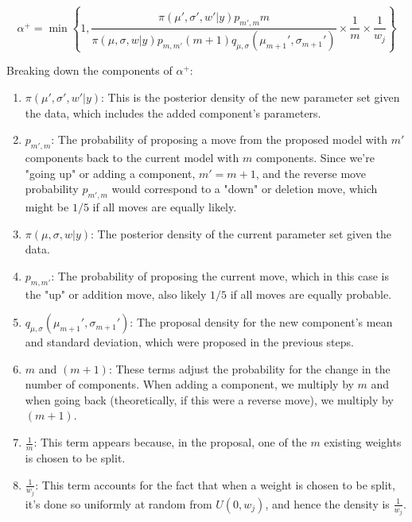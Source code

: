 \documentclass[10pt]{article}
\begin{document}
\[ \alpha^+ = \min \left\{ 1, \frac{\pi(\mu', \sigma', w'|y)p_{m',m}m}{\pi(\mu, \sigma, w|y)p_{m,m'}(m+1)q_{\mu,\sigma}(\mu_{m+1}', \sigma_{m+1}')}\times \frac{1}{m} \times \frac{1}{w_j} \right\} \]

Breaking down the components of \( \alpha^+ \):

\begin{enumerate}
  \item \( \pi(\mu', \sigma', w'|y) \): This is the posterior density of the new parameter set given the data, which includes the added component's parameters.

  \item \( p_{m',m} \): The probability of proposing a move from the proposed model with \( m' \) components back to the current model with \( m \) components. Since we're "going up" or adding a component, \( m' = m + 1 \), and the reverse move probability \( p_{m',m} \) would correspond to a "down" or deletion move, which might be \( 1/5 \) if all moves are equally likely.

  \item \( \pi(\mu, \sigma, w|y) \): The posterior density of the current parameter set given the data.

  \item \( p_{m,m'} \): The probability of proposing the current move, which in this case is the "up" or addition move, also likely \( 1/5 \) if all moves are equally probable.

  \item \( q_{\mu,\sigma}(\mu_{m+1}', \sigma_{m+1}') \): The proposal density for the new component's mean and standard deviation, which were proposed in the previous steps.

  \item \( m \) and \( (m+1) \): These terms adjust the probability for the change in the number of components. When adding a component, we multiply by \( m \) and when going back (theoretically, if this were a reverse move), we multiply by \( (m+1) \).

  \item \( \frac{1}{m} \): This term appears because, in the proposal, one of the \( m \) existing weights is chosen to be split.

  \item \( \frac{1}{w_j} \): This term accounts for the fact that when a weight is chosen to be split, it's done so uniformly at random from \( U(0, w_j) \), and hence the density is \( \frac{1}{w_j} \).

\end{enumerate}
\end{document}

